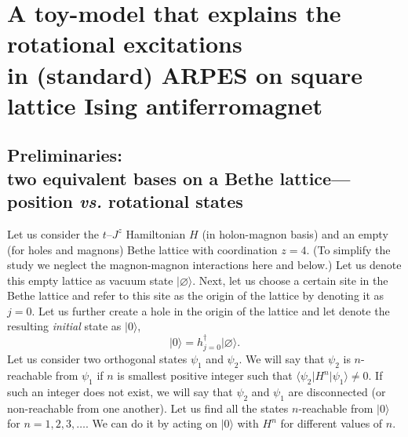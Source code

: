 \documentclass[10pt, a4paper, onecolumn]{article}
\newcommand{\ket}[1]{\vert #1 \rangle}
\newcommand{\bra}[1]{\langle #1 \vert}
\begin{document}
\section{A toy-model that  explains the rotational excitations \\ in (standard) ARPES on square lattice Ising antiferromagnet}
\subsection{Preliminaries:\\
two equivalent bases on a Bethe lattice---position {\it vs.} rotational states}

Let us consider the $t$--$J^z$ Hamiltonian $H$ (in holon-magnon basis) and an empty (for holes and magnons) Bethe lattice with coordination $z=4$. (To simplify the study we neglect the magnon-magnon interactions here and below.)
Let us denote this empty lattice as vacuum state $\ket{\varnothing}$. Next, let us choose a certain site in the Bethe lattice and refer to this site as the origin of the lattice by denoting it as $j=0$. Let us further create a hole in the origin of the lattice and let denote the resulting \textit{initial} state as $\ket{0}$,
\begin{equation}
	\ket{0} = h_{j=0}^\dag \ket{\varnothing}.
\end{equation} 
Let us consider two orthogonal states $\psi_1$ and $\psi_2$. We will say that $\psi_2$ is $n$-reachable from $\psi_1$ if $n$ is smallest positive integer such that $\bra{\psi_2}H^n\ket{\psi_1} \neq 0$. If such an integer does not exist, we will say that $\psi_2$ and $\psi_1$ are disconnected (or non-reachable from one another). Let us find all the states $n$-reachable from $\ket{0}$ for $n=1,2,3,\hdots$. We can do it by acting on $\ket{0}$ with $H^n$ for different values of $n$. 
\end{document}
